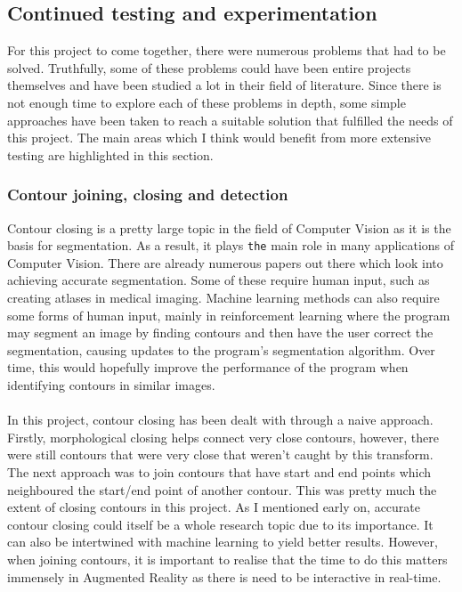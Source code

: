 \documentclass[11pt]{article}
\begin{document}
\subsection{Continued testing and experimentation} 
For this project to come together, there were numerous problems that
had to be solved. Truthfully, some of these problems could have been entire
projects themselves and have been studied a lot in their field of literature.
Since there is not enough time to explore each of these problems in 
depth, some simple approaches have been taken to reach a suitable solution
that fulfilled the needs of this project. The main areas which I think would
benefit from more extensive testing are highlighted in this section.

\subsubsection{Contour joining, closing and detection}
Contour closing is a pretty large topic in the field of Computer Vision as 
it is the basis for segmentation. As a result, it plays \texttt{the} main role
in many applications of Computer Vision. There are 
already numerous papers out there which look into achieving accurate segmentation.
Some of these require human input, such as creating atlases in medical imaging.
Machine learning methods can also require some forms of human input, mainly in 
reinforcement learning where the program may segment an image by finding contours 
and then have the user correct the segmentation, causing updates to the program's
segmentation algorithm. Over time, this would hopefully improve the performance
of the program when identifying contours in similar images. \\
\\
In this project, contour closing has been dealt with through 
a naive approach. Firstly, morphological closing helps connect 
very close contours, however, there were still contours that were 
very close that weren't caught by this transform. The next approach 
was to join contours that have start and end points which
neighboured the start/end point of another contour. This was pretty much
the extent of closing contours in this project. As I mentioned early on, 
accurate contour closing could itself be a whole
research topic due to its importance. It can also be intertwined with 
machine learning to yield better results. However, when joining contours,
it is important to realise that the time to do this matters immensely in 
Augmented Reality as there is need to be interactive in real-time.\\
\end{document}
